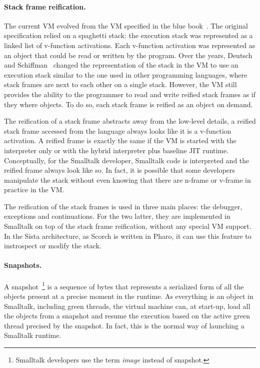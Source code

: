 \documentclass[a4paper,12pt,twoside]{../includes/ThesisStyle}
\begin{document}

\paragraph{Stack frame reification.}

The current VM evolved from the VM specified in the blue book~\cite{Gold83a}. The original specification relied on a spaghetti stack: the execution stack was represented as a linked list of v-function activations. Each v-function activation was represented as an object that could be read or written by the program. Over the years, Deutsch and Schiffman~\cite{Deut84a} changed the representation of the stack in the VM to use an execution stack similar to the one used in other programming languages, where stack frames are next to each other on a single stack. However, the VM still provides the ability to the programmer to read and write reified stack frames as if they where objects. To do so, each stack frame is reified as an object on demand. 

The reification of a stack frame abstracts away from the low-level details, a reified stack frame accessed from the language always looks like it is a v-function activation. A reified frame is exactly the same if the VM is started with the interpreter only or with the hybrid interpreter plus baseline JIT runtime. Conceptually, for the Smalltalk developer, Smalltalk code is interpreted and the reified frame always look like so. In fact, it is possible that some developers manipulate the stack without even knowing that there are n-frame or v-frame in practice in the VM.

The reification of the stack frames is used in three main places: the debugger, exceptions and continuations. For the two latter, they are implemented in Smalltalk on top of the stack frame reification, without any special VM support. In the Sista architecture, as Scorch is written in Pharo, it can use this feature to instrospect or modify the stack.

\paragraph{Snapshots.}

A snapshot~\footnote{Smalltalk developers use the term \emph{image} instead of snapshot.} is a sequence of bytes that represents a serialized form of all the objects present at a precise moment in the runtime. As everything is an object in Smalltalk, including green threads, the virtual machine can, at start-up, load all the objects from a snapshot and resume the execution based on the active green thread precised by the snapshot. In fact, this is the normal way of launching a Smalltalk runtime. 
\end{document}
